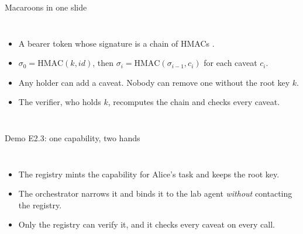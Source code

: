 \documentclass[aspectratio=169, 10pt]{beamer}
\begin{document}
\begin{frame}{Macaroons in one slide}
  \begin{columns}[T]
    \begin{itemize}\small
      \item A bearer token whose signature is a chain of HMACs .
      \item $\sigma_0 = \mathrm{HMAC}(k, \mathit{id})$, then $\sigma_i = \mathrm{HMAC}(\sigma_{i-1}, c_i)$ for each caveat $c_i$.
      \item Any holder can add a caveat. Nobody can remove one without the root key $k$.
      \item The verifier, who holds $k$, recomputes the chain and checks every caveat.
    \end{itemize}
  \end{columns}
\end{frame}

\begin{frame}{Demo E2.3: one capability, two hands}
  \begin{columns}[T]
    \small
    \begin{itemize}
      \item The registry mints the capability for Alice's task and keeps the root key.
      \item The orchestrator narrows it and binds it to the lab agent \emph{without} contacting the registry.
      \item Only the registry can verify it, and it checks every caveat on every call.
    \end{itemize}
  \end{columns}
\end{frame}
\end{document}
